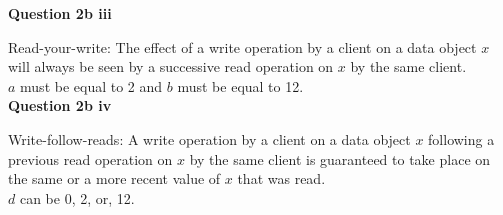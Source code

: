 \documentclass[11pt,a4paper]{report}
\begin{document}
\begin{multicols*}{2}
\noindent \textbf{Question 2b iii}

\noindent Read-your-write: The effect of a write operation by a client on a data object $x$ will always be seen by a successive read operation on $x$ by the same client.\\

\noindent $a$ must be equal to 2 and $b$ must be equal to 12.\\


\noindent \textbf{Question 2b iv}

\noindent Write-follow-reads: A write operation by a client on a data object $x$ following a previous read operation on $x$ by the same client is guaranteed to take place on the same or a more recent value of $x$ that was read.\\

\noindent $d$ can be 0, 2, or, 12.


\end{multicols*}
\end{document}
